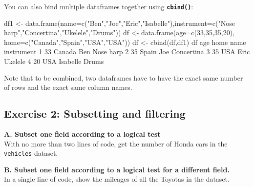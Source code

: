 \documentclass[
]{book}
\newenvironment{Shaded}{\begin{snugshade}}{\end{snugshade}}
\newcommand{\AttributeTok}[1]{\textcolor[rgb]{0.77,0.63,0.00}{#1}}
\newcommand{\DecValTok}[1]{\textcolor[rgb]{0.00,0.00,0.81}{#1}}
\newcommand{\FunctionTok}[1]{\textcolor[rgb]{0.00,0.00,0.00}{#1}}
\newcommand{\NormalTok}[1]{#1}
\newcommand{\OtherTok}[1]{\textcolor[rgb]{0.56,0.35,0.01}{#1}}
\newcommand{\StringTok}[1]{\textcolor[rgb]{0.31,0.60,0.02}{#1}}
\begin{document}
You can also bind multiple dataframes together using \textbf{\texttt{cbind()}}:

\begin{Shaded}
\begin{Highlighting}[]
\NormalTok{df1 }\OtherTok{\textless{}{-}} \FunctionTok{data.frame}\NormalTok{(}\AttributeTok{name=}\FunctionTok{c}\NormalTok{(}\StringTok{"Ben"}\NormalTok{,}\StringTok{"Joe"}\NormalTok{,}\StringTok{"Eric"}\NormalTok{,}\StringTok{"Isabelle"}\NormalTok{),}\AttributeTok{instrument=}\FunctionTok{c}\NormalTok{(}\StringTok{"Nose harp"}\NormalTok{,}\StringTok{"Concertina"}\NormalTok{,}\StringTok{"Ukelele"}\NormalTok{,}\StringTok{"Drums"}\NormalTok{))}
\NormalTok{df }\OtherTok{\textless{}{-}} \FunctionTok{data.frame}\NormalTok{(}\AttributeTok{age=}\FunctionTok{c}\NormalTok{(}\DecValTok{33}\NormalTok{,}\DecValTok{35}\NormalTok{,}\DecValTok{35}\NormalTok{,}\DecValTok{20}\NormalTok{), }\AttributeTok{home=}\FunctionTok{c}\NormalTok{(}\StringTok{"Canada"}\NormalTok{,}\StringTok{"Spain"}\NormalTok{,}\StringTok{"USA"}\NormalTok{,}\StringTok{"USA"}\NormalTok{))}
\NormalTok{df }\OtherTok{\textless{}{-}} \FunctionTok{cbind}\NormalTok{(df,df1)}
\NormalTok{df}
\NormalTok{  age   home     name instrument}
\DecValTok{1}  \DecValTok{33}\NormalTok{ Canada      Ben  Nose harp}
\DecValTok{2}  \DecValTok{35}\NormalTok{  Spain      Joe Concertina}
\DecValTok{3}  \DecValTok{35}\NormalTok{    USA     Eric    Ukelele}
\DecValTok{4}  \DecValTok{20}\NormalTok{    USA Isabelle      Drums}
\end{Highlighting}
\end{Shaded}

Note that to be combined, two dataframes have to have the exact same number of rows and the exact same column names.

\hypertarget{exercise-2-subsetting-and-filtering}{%
\subsection*{Exercise 2: Subsetting and filtering}\label{exercise-2-subsetting-and-filtering}}

\textbf{A. Subset one field according to a logical test}\\
With no more than two lines of code, get the number of Honda cars in the \texttt{vehicles} dataset.

\textbf{B. Subset one field according to a logical test for a different field.}\\
In a single line of code, show the mileages of all the Toyotas in the dataset.
\end{document}
